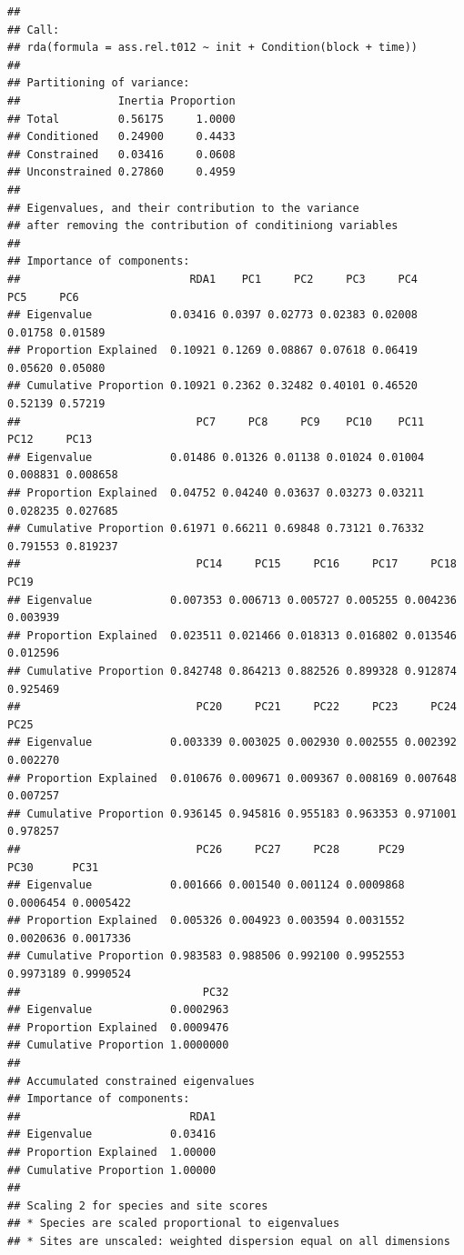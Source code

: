 \documentclass[
]{article}
\begin{document}
\begin{verbatim}
## 
## Call:
## rda(formula = ass.rel.t012 ~ init + Condition(block + time)) 
## 
## Partitioning of variance:
##               Inertia Proportion
## Total         0.56175     1.0000
## Conditioned   0.24900     0.4433
## Constrained   0.03416     0.0608
## Unconstrained 0.27860     0.4959
## 
## Eigenvalues, and their contribution to the variance 
## after removing the contribution of conditiniong variables
## 
## Importance of components:
##                          RDA1    PC1     PC2     PC3     PC4     PC5     PC6
## Eigenvalue            0.03416 0.0397 0.02773 0.02383 0.02008 0.01758 0.01589
## Proportion Explained  0.10921 0.1269 0.08867 0.07618 0.06419 0.05620 0.05080
## Cumulative Proportion 0.10921 0.2362 0.32482 0.40101 0.46520 0.52139 0.57219
##                           PC7     PC8     PC9    PC10    PC11     PC12     PC13
## Eigenvalue            0.01486 0.01326 0.01138 0.01024 0.01004 0.008831 0.008658
## Proportion Explained  0.04752 0.04240 0.03637 0.03273 0.03211 0.028235 0.027685
## Cumulative Proportion 0.61971 0.66211 0.69848 0.73121 0.76332 0.791553 0.819237
##                           PC14     PC15     PC16     PC17     PC18     PC19
## Eigenvalue            0.007353 0.006713 0.005727 0.005255 0.004236 0.003939
## Proportion Explained  0.023511 0.021466 0.018313 0.016802 0.013546 0.012596
## Cumulative Proportion 0.842748 0.864213 0.882526 0.899328 0.912874 0.925469
##                           PC20     PC21     PC22     PC23     PC24     PC25
## Eigenvalue            0.003339 0.003025 0.002930 0.002555 0.002392 0.002270
## Proportion Explained  0.010676 0.009671 0.009367 0.008169 0.007648 0.007257
## Cumulative Proportion 0.936145 0.945816 0.955183 0.963353 0.971001 0.978257
##                           PC26     PC27     PC28      PC29      PC30      PC31
## Eigenvalue            0.001666 0.001540 0.001124 0.0009868 0.0006454 0.0005422
## Proportion Explained  0.005326 0.004923 0.003594 0.0031552 0.0020636 0.0017336
## Cumulative Proportion 0.983583 0.988506 0.992100 0.9952553 0.9973189 0.9990524
##                            PC32
## Eigenvalue            0.0002963
## Proportion Explained  0.0009476
## Cumulative Proportion 1.0000000
## 
## Accumulated constrained eigenvalues
## Importance of components:
##                          RDA1
## Eigenvalue            0.03416
## Proportion Explained  1.00000
## Cumulative Proportion 1.00000
## 
## Scaling 2 for species and site scores
## * Species are scaled proportional to eigenvalues
## * Sites are unscaled: weighted dispersion equal on all dimensions

\end{verbatim}
\end{document}
